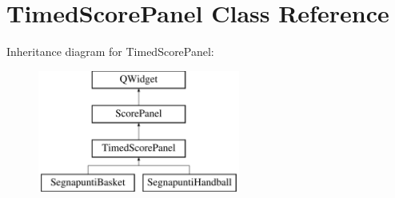 \hypertarget{classTimedScorePanel}{}\section{Timed\+Score\+Panel Class Reference}
\label{classTimedScorePanel}
Inheritance diagram for Timed\+Score\+Panel\+:\begin{figure}[H]
\begin{center}
\leavevmode
\includegraphics[height=4.000000cm]{d2/dc4/classTimedScorePanel}
\end{center}
\end{figure}
